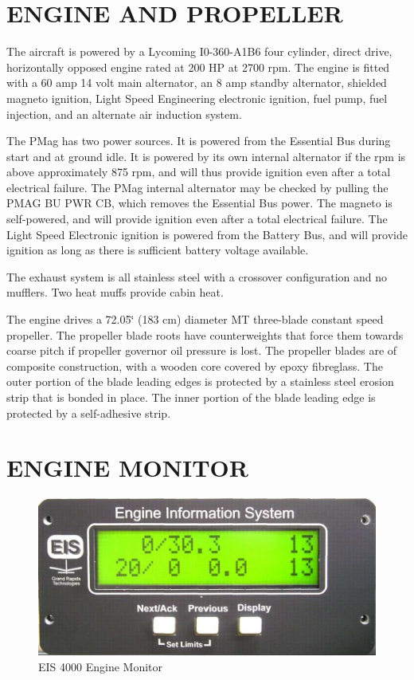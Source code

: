 \section{ENGINE AND PROPELLER}

The aircraft is powered by a Lycoming I0-360-A1B6 four cylinder, direct drive, horizontally opposed engine rated at 200 HP at 2700 rpm. The engine is fitted with a 60 amp 14 volt main alternator, an 8 amp standby alternator, 
{shielded magneto ignition,}
 Light Speed Engineering electronic ignition, fuel pump, fuel injection, and an alternate air induction system. 
 
{The PMag has two power sources. It is powered from the Essential Bus during start and at ground idle. It is powered by its own internal alternator if the rpm is above approximately 875 rpm, and will thus provide ignition even after a total electrical failure. The PMag internal alternator may be checked by pulling the PMAG BU PWR CB, which removes the Essential Bus power.}
{The magneto is self-powered, and will provide ignition even after a total electrical failure.} 
The Light Speed Electronic ignition is powered from the Battery Bus, and will provide ignition as long as there is sufficient battery voltage available.

The exhaust system is all stainless steel with a crossover configuration and no mufflers. Two heat muffs provide cabin heat.

The engine drives a 72.05\char`\"{} (183 cm) diameter MT three-blade constant speed propeller. The propeller blade roots have counterweights that force them towards coarse pitch if propeller governor oil pressure is lost. The propeller blades are of composite construction, with a wooden core covered by epoxy fibreglass. The outer portion of the blade leading edges is protected by a stainless steel erosion strip that is bonded in place. The inner portion of the blade leading edge is protected by a self-adhesive strip.

\section{ENGINE MONITOR} 
\begin{figure}
	
	\includegraphics{../Diagrams/eis1} \caption{EIS 4000 Engine Monitor} 
\end{figure}


